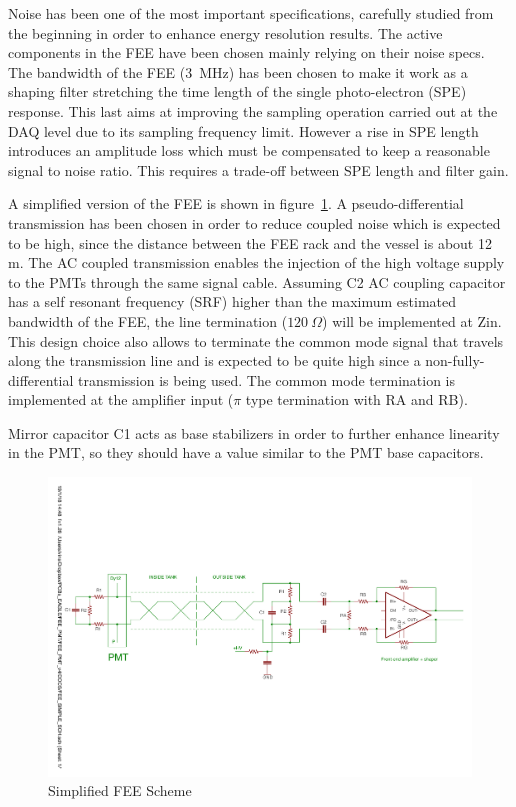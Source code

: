 \documentclass[a4paper, 10pt, oneside, twocolumn, 3p]{elsarticle}
\begin{document}
\par Noise has been one of the most important specifications, carefully studied from the beginning in order to enhance energy resolution results. The active components in the FEE have been chosen mainly relying on their noise specs. The bandwidth of the FEE (3~MHz) has been chosen to make it work as a shaping filter stretching the time length of the single photo-electron (SPE) response. This last aims at improving the sampling operation carried out at the DAQ level due to its sampling frequency limit. However a rise in SPE length introduces an amplitude loss which must be compensated to keep a reasonable signal to noise ratio. This requires a trade-off between SPE length and filter gain.   


\par   A simplified version of the FEE is shown in figure~\ref{fig:FEE_scheme}. A pseudo-differential transmission has been chosen in order to reduce coupled noise which is expected to be high, since the distance between the FEE rack and the vessel is about 12 m. The AC coupled transmission enables the injection of the high voltage supply to the PMTs through the same signal cable. Assuming C2 AC coupling capacitor has a self resonant frequency (SRF) higher than the maximum estimated bandwidth of the FEE,  the line termination ($120~\Omega$) will be implemented at Zin. This design choice also allows to terminate the common mode signal that travels along the transmission line and is expected to be quite high since a non-fully-differential transmission is being used. The common mode termination is implemented at the amplifier input ($\pi$ type termination with RA and RB).

\par Mirror capacitor C1 acts as base stabilizers in order to further enhance linearity in the PMT, so they should have a value similar to the PMT base capacitors.


\begin{figure}
	\begin{center}
		\includegraphics[width=.55\textwidth]{./figures/FEE_simple_scheme.pdf}
		\caption{Simplified FEE Scheme}
		\label{fig:FEE_scheme}
	\end{center}
\end{figure}
\end{document}
